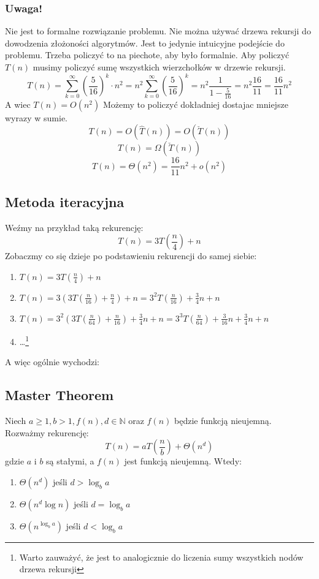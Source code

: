 \documentclass[11pt,a4paper]{article}
\begin{document}
\subsubsection*{Uwaga!}
Nie jest to formalne rozwiązanie problemu. Nie można używać drzewa rekursji do dowodzenia złożoności algorytmów. Jest to jedynie intuicyjne podejście do problemu. Trzeba policzyć to na piechote, aby było formalnie.\newline
Aby policzyć $T(n)$ musimy policzyć sumę wszystkich wierzchołków w drzewie rekursji.
\[
    T(n) = \sum^{\infty}_{k=0} \left(\frac{5}{16}\right)^k \cdot n^2 = n^2 \sum^{\infty}_{k=0} \left(\frac{5}{16}\right)^k = n^2 \frac{1}{1-\frac{5}{16}} = n^2 \frac{16}{11} = \frac{16}{11}n^2
\]
A wiec $T(n) = O(n^2)$
\newline
Możemy to policzyć dokładniej dostajac mniejsze wyrazy w sumie.
\[
    T(n) = O(\hat{T}(n)) = O(\check{T}(n))
\]
\[
    T(n) = \Omega(\check{T}(n))
\]
\[
    T(n) = \Theta(n^2) = \frac{16}{11}n^2 + o(n^2)
\]

\subsection{Metoda iteracyjna}
Weźmy na przykład taką rekurencję:
\[
    T(n) = 3T(\frac{n}{4}) + n
\]
Zobaczmy co się dzieje po podstawieniu rekurencji do samej siebie:
\begin{enumerate}
    \item $T(n) = 3T(\frac{n}{4}) + n$
    \item $T(n) = 3(3T(\frac{n}{16}) + \frac{n}{4}) + n = 3^2T(\frac{n}{16}) + \frac{3}{4}n + n$
    \item $T(n) = 3^2(3T(\frac{n}{64}) + \frac{n}{16}) + \frac{3}{4}n + n = 3^3T(\frac{n}{64}) + \frac{3}{16}n + \frac{3}{4}n + n$
    \item \dots \footnote{Warto zauważyć, że jest to analogicznie do liczenia sumy wszystkich nodów drzewa rekursji}
\end{enumerate}
A więc ogólnie wychodzi:
\[
\]
\subsection{Master Theorem}
Niech $a \geq 1, b > 1, f(n), d \in \mathbb{N}$ oraz $f(n)$ będzie funkcją nieujemną. Rozważmy rekurencję:
\[
    T(n) = aT(\frac{n}{b}) + \Theta(n^d)
\]
gdzie $a$ i $b$ są stałymi, a $f(n)$ jest funkcją nieujemną. Wtedy:
\begin{enumerate}
    \item $\Theta(n^d)$ jeśli $d > \log_b a$
    \item $\Theta(n^d \log n)$ jeśli $d = \log_b a$
    \item $\Theta(n^{\log_b a})$ jeśli $d < \log_b a$
\end{enumerate}
\end{document}

